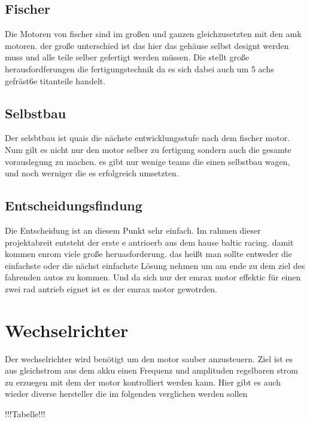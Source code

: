 \subsection{Fischer}
Die Motoren von fischer sind im großen und ganzen gleichzusetzten mit den amk motoren. der große unterschied ist das hier das gehäuse selbst designt werden muss und alle teile selber gefertigt werden müssen. Die stellt große herausfordferungen die fertigungstechnik da es sich dabei auch um 5 achs gefräst6e titanteile handelt. 

\subsection{Selbstbau}
Der selsbtbau ist quais die nächste entwicklungsstufe nach dem fischer motor. Num gilt es nicht nur den motor selber zu fertigung sondern auch die gesamte vorauslegung zu machen. es gibt nur wenige teams die einen selbstbau wagen, und noch werniger die es erfolgreich umsetzten.

\subsection{Entscheidungsfindung}

Die Entscheidung ist an diesem Punkt sehr einfach. Im rahmen dieser projektabreit entsteht der erste e antrioerb aus dem hause baltic racing. damit kommen enrom viele große heruasforderung. das heißt man sollte entweder die einfachste oder die nächst einfachste Lösung nehmen um am ende zu dem ziel des fahrenden autos zu kommen. Und da sich nur der emrax motor effektic für einen zwei rad antrieb eignet ist es der emrax motor gewotrden.

\section{Wechselrichter}
Der wechselrichter wird benötigt um den motor sauber anzusteuern. Ziel ist es aus gleichstrom aus dem akku einen Frequenz und amplituden regelbaren strom zu erzuegen mit dem der motor kontrolliert werden kann. Hier gibt es auch wieder diverse hersteller die im folgenden verglichen werden sollen

!!!Tabelle!!!

